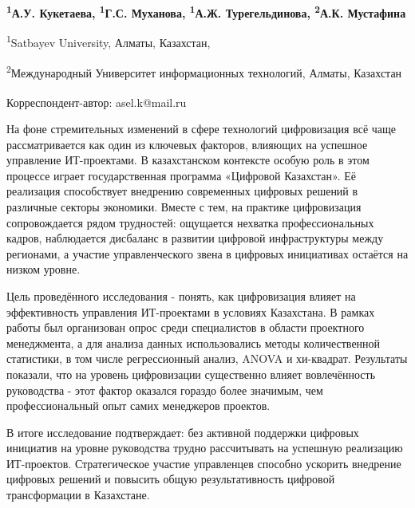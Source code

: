 
\begin{articleheader}

{\bfseries
\textsuperscript{1}А.У. Кукетаева\textsuperscript{\envelope },
\textsuperscript{1}Г.С. Муханова,
\textsuperscript{1}А.Ж. Турегельдинова,
\textsuperscript{2}А.К. Мустафина
}
\end{articleheader}

\begin{affiliation}
\textsuperscript{1}Satbayev University, Алматы, Казахстан,

\textsuperscript{2}Международный Университет информационных технологий, Алматы, Казахстан

\raggedright \textsuperscript{\envelope }Корреспондент-автор: asel.k@mail.ru
\end{affiliation}

На фоне стремительных изменений в сфере технологий цифровизация всё чаще
рассматривается как один из ключевых факторов, влияющих на успешное
управление ИТ-проектами. В казахстанском контексте особую роль в этом
процессе играет государственная программа «Цифровой Казахстан». Её
реализация способствует внедрению современных цифровых решений в
различные секторы экономики. Вместе с тем, на практике цифровизация
сопровождается рядом трудностей: ощущается нехватка профессиональных
кадров, наблюдается дисбаланс в развитии цифровой инфраструктуры между
регионами, а участие управленческого звена в цифровых инициативах
остаётся на низком уровне.

Цель проведённого исследования - понять, как цифровизация влияет на
эффективность управления ИТ-проектами в условиях Казахстана. В рамках
работы был организован опрос среди специалистов в области проектного
менеджмента, а для анализа данных использовались методы количественной
статистики, в том числе регрессионный анализ, ANOVA и хи-квадрат.
Результаты показали, что на уровень цифровизации существенно влияет
вовлечённость руководства - этот фактор оказался гораздо более значимым,
чем профессиональный опыт самих менеджеров проектов.

В итоге исследование подтверждает: без активной поддержки цифровых
инициатив на уровне руководства трудно рассчитывать на успешную
реализацию ИТ-проектов. Стратегическое участие управленцев способно
ускорить внедрение цифровых решений и повысить общую результативность
цифровой трансформации в Казахстане.


